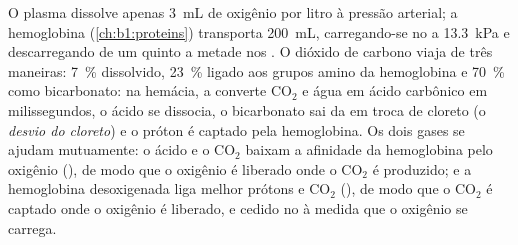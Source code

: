 \begin{proposition}\label{prop:b1:gas-exchange:transport}
O plasma dissolve apenas \qty{3}{mL} de oxigênio por litro à pressão
arterial; a hemoglobina (\cref{ch:b1:proteins}) transporta
\qty{200}{mL}, carregando-se no  a \qty{13.3}{kPa} e
descarregando de um quinto a metade nos . O dióxido de carbono
viaja de três maneiras: \qty{7}{\%} dissolvido, \qty{23}{\%} ligado
aos grupos amino da hemoglobina e \qty{70}{\%} como bicarbonato: na
hemácia, a \emph{} converte $\mathrm{CO_2}$ e água
em ácido carbônico em milissegundos, o ácido se dissocia, o
bicarbonato sai da  em troca de cloreto (o \emph{desvio do
cloreto}) e o próton é captado pela hemoglobina. Os dois gases se
ajudam mutuamente: o ácido e o $\mathrm{CO_2}$ baixam a afinidade da
hemoglobina pelo oxigênio (\emph{}), de modo que o oxigênio
é liberado onde o $\mathrm{CO_2}$ é produzido; e a hemoglobina
desoxigenada liga melhor prótons e $\mathrm{CO_2}$ (\emph{}), de modo que o $\mathrm{CO_2}$ é captado onde o oxigênio é
liberado, e cedido no  à medida que o oxigênio se carrega.
\end{proposition}

